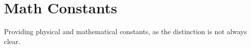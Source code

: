 \section{Math Constants}
Providing physical and mathematical constants, as the distinction is not
always clear.
